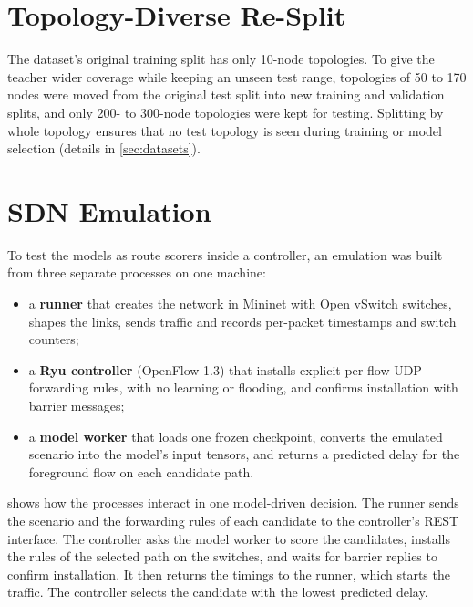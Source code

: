 \section{Topology-Diverse Re-Split}
\label{sec:diverse}

The dataset's original training split has only 10-node topologies. To give the teacher wider coverage while keeping an unseen test range, topologies of 50 to 170 nodes were moved from the original test split into new training and validation splits, and only 200- to 300-node topologies were kept for testing. Splitting by whole topology ensures that no test topology is seen during training or model selection (details in \cref{sec:datasets}).

\section{SDN Emulation}
\label{sec:emulation-method}

To test the models as route scorers inside a controller, an emulation was built from three separate processes on one machine:
\begin{itemize}
  \item a \textbf{runner} that creates the network in Mininet \cite{lantz2010mininet} with Open vSwitch switches, shapes the links, sends traffic and records per-packet timestamps and switch counters;
  \item a \textbf{Ryu controller} \cite{ryu} (OpenFlow 1.3) that installs explicit per-flow UDP forwarding rules, with no learning or flooding, and confirms installation with barrier messages;
  \item a \textbf{model worker} that loads one frozen checkpoint, converts the emulated scenario into the model's input tensors, and returns a predicted delay for the foreground flow on each candidate path.
\end{itemize}
 shows how the processes interact in one model-driven decision. The runner sends the scenario and the forwarding rules of each candidate to the controller's REST interface. The controller asks the model worker to score the candidates, installs the rules of the selected path on the switches, and waits for barrier replies to confirm installation. It then returns the timings to the runner, which starts the traffic. The controller selects the candidate with the lowest predicted delay.

